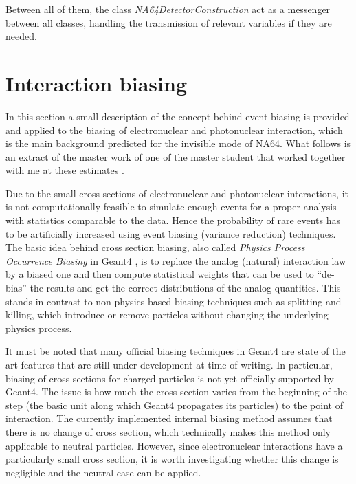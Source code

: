 Between all of them, the class \textit{NA64DetectorConstruction} act as a messenger between all classes, handling the transmission of relevant variables if they are needed.


\section{Interaction biasing}
\label{appC:sec:physics-list}

In this section a small description of the concept behind event biasing is provided and applied to the biasing of electronuclear and photonuclear interaction, which is the main background predicted for the invisible mode of NA64. What follows is an extract of the master work of one of the master student that worked together with me at these estimates \cite{pdegen-thesis}.

Due to the small cross sections of electronuclear and photonuclear interactions, it is not computationally feasible to simulate enough events for a proper analysis with statistics comparable to the data. Hence the probability of rare events has to be artificially increased using event biasing (variance reduction) techniques. The basic idea behind cross section biasing, also called \textit{Physics Process Occurrence Biasing} in Geant4 \cite{G4bias}, is to replace the analog (natural) interaction law by a biased one and then compute statistical weights that can be used to ``de-bias'' the results and get the correct distributions of the analog quantities. This stands in contrast to non-physics-based biasing techniques such as splitting and killing, which introduce or remove particles without changing the underlying physics process.

It must be noted that many official biasing techniques in Geant4 are state of the art features that are still under development at time of writing. In particular, biasing of cross sections for charged particles is not yet officially supported by Geant4. The issue is how much the cross section varies from the beginning of the step (the basic unit along which Geant4 propagates its particles) to the point of interaction. The currently implemented internal biasing method assumes that there is no change of cross section, which technically makes this method only applicable to neutral particles. However, since electronuclear interactions have a particularly small cross section, it is worth investigating whether this change is negligible and the neutral case can be applied.

